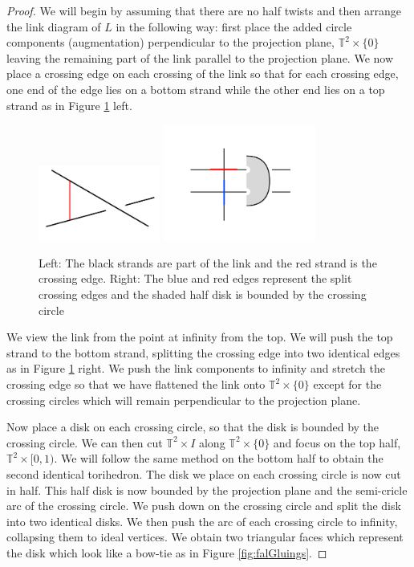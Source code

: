 \documentclass[11pt]{amsart}
\newcommand{\torus}{{\mathbb{T}^2}}
\theoremstyle{plain}
\theoremstyle{definition}
\begin{document}
\begin{proof}
We will begin by assuming that there are no half twists and then
arrange the link diagram of $L$ in the following way: first place the added
circle components (augmentation) perpendicular to the projection plane, $\torus
\times \{0\}$ leaving the remaining part of the link parallel to the projection
plane.  We now place a crossing edge on each crossing of the link so that for
each crossing edge, one end of the edge lies on a bottom strand while the other
end lies on a top strand as in Figure \ref{fig:crossingArc} left.

\begin{figure} \centering \includegraphics[width=4cm]{crossingArc}
\includegraphics[width=5cm]{crossingPush} \caption{Left: The black strands are
part of the link and the red strand is the crossing edge. Right: The blue and
red edges represent the split crossing edges and the shaded half disk is bounded
by the crossing circle} \label{fig:crossingArc} \end{figure}

\indent We view the link from the point at infinity from the top. We will push
the top strand to the bottom strand, splitting the crossing edge into two
identical edges as in Figure \ref{fig:crossingArc} right. We push the link
components to infinity and stretch the crossing edge so that we have flattened
the link onto $\torus \times \{0\}$ except for the crossing circles which will
remain perpendicular to the projection plane. 
 
\indent Now place a disk on each crossing circle, so that the disk is bounded by
the crossing circle. We can then cut $\torus \times I$ along $\torus \times \{0\}$ and
focus on the top half, $\torus \times [0,1)$. We will follow the same method on the
bottom half to obtain the second identical torihedron. The disk we place on each
crossing circle is now cut in half. This half disk is now bounded by the
projection plane and the semi-cricle arc of the crossing circle. We push down on
the crossing circle and split the disk into two identical disks. We then push
the arc of each crossing circle to infinity, collapsing them to ideal vertices.
We obtain two triangular faces which represent the disk which look like a
bow-tie as in Figure \ref{fig:falGluings}. 


\end{proof}
\end{document}
